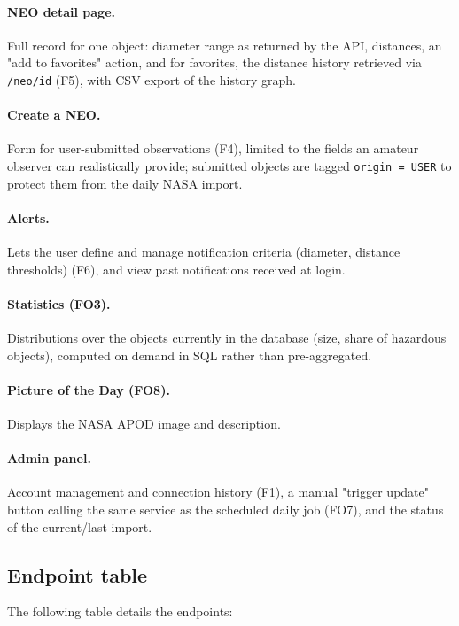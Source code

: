 \paragraph{NEO detail page.}
Full record for one object: diameter range as returned by the API, distances, an "add to favorites" action, and for favorites, the distance history retrieved via \texttt{/neo/id} (F5), with CSV export of the history graph.

\paragraph{Create a NEO.}
Form for user-submitted observations (F4), limited to the fields an amateur observer can realistically provide; submitted objects are tagged \texttt{origin = USER} to protect them from the daily NASA import.

\paragraph{Alerts.}
Lets the user define and manage notification criteria (diameter, distance thresholds) (F6), and view past notifications received at login.

\paragraph{Statistics (FO3).}
Distributions over the objects currently in the database (size, share of hazardous objects), computed on demand in SQL rather than pre-aggregated.

\paragraph{Picture of the Day (FO8).}
Displays the NASA APOD image and description.

\paragraph{Admin panel.}
Account management and connection history (F1), a manual "trigger update" button calling the same service as the scheduled daily job (FO7), and the status of the current/last import.

\newpage
\subsection{Endpoint table}

The following table details the endpoints:

